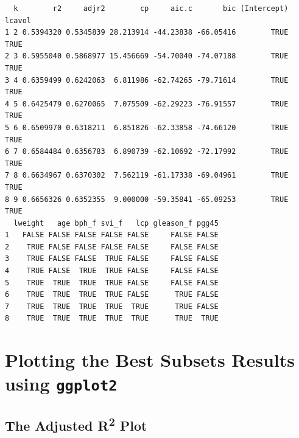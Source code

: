 \documentclass[]{book}
\theoremstyle{definition}
\theoremstyle{definition}
\theoremstyle{definition}
\theoremstyle{remark}
\begin{document}
\begin{verbatim}
  k        r2     adjr2        cp     aic.c       bic (Intercept) lcavol
1 2 0.5394320 0.5345839 28.213914 -44.23838 -66.05416        TRUE   TRUE
2 3 0.5955040 0.5868977 15.456669 -54.70040 -74.07188        TRUE   TRUE
3 4 0.6359499 0.6242063  6.811986 -62.74265 -79.71614        TRUE   TRUE
4 5 0.6425479 0.6270065  7.075509 -62.29223 -76.91557        TRUE   TRUE
5 6 0.6509970 0.6318211  6.851826 -62.33858 -74.66120        TRUE   TRUE
6 7 0.6584484 0.6356783  6.890739 -62.10692 -72.17992        TRUE   TRUE
7 8 0.6634967 0.6370302  7.562119 -61.17338 -69.04961        TRUE   TRUE
8 9 0.6656326 0.6352355  9.000000 -59.35841 -65.09253        TRUE   TRUE
  lweight   age bph_f svi_f   lcp gleason_f pgg45
1   FALSE FALSE FALSE FALSE FALSE     FALSE FALSE
2    TRUE FALSE FALSE FALSE FALSE     FALSE FALSE
3    TRUE FALSE FALSE  TRUE FALSE     FALSE FALSE
4    TRUE FALSE  TRUE  TRUE FALSE     FALSE FALSE
5    TRUE  TRUE  TRUE  TRUE FALSE     FALSE FALSE
6    TRUE  TRUE  TRUE  TRUE FALSE      TRUE FALSE
7    TRUE  TRUE  TRUE  TRUE  TRUE      TRUE FALSE
8    TRUE  TRUE  TRUE  TRUE  TRUE      TRUE  TRUE
\end{verbatim}

\section{\texorpdfstring{Plotting the Best Subsets Results using
\texttt{ggplot2}}{Plotting the Best Subsets Results using ggplot2}}\label{plotting-the-best-subsets-results-using-ggplot2}

\subsection{\texorpdfstring{The Adjusted R\textsuperscript{2}
Plot}{The Adjusted R2 Plot}}\label{the-adjusted-r2-plot}
\end{document}
